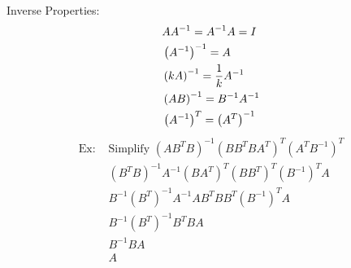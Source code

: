 \documentclass[11pt, fleqn]{article}
\begin{document}
Inverse Properties:
\begin{align*}
    &AA^{-1}=A^{-1}A=I\\
    &\left( A^{-1} \right)^{-1}=A\\
    &\left( kA \right)^{-1}=\frac{1}{k}A^{-1}\\
    &\left( AB \right)^{-1}=B^{-1}A^{-1}\\
    &\left( A^{-1} \right)^T=\left( A^T \right)^{-1}
\end{align*}
\begin{align*}
    \text{Ex: }&\text{Simplify }(AB^TB)^{-1}(BB^TBA^T)^T(A^TB^{-1})^T\\
    &(B^TB)^{-1}A^{-1}(BA^T)^T(BB^T)^T(B^{-1})^TA\\
    &B^{-1}(B^T)^{-1}A^{-1}AB^TBB^T(B^{-1})^TA\\
    &B^{-1}(B^T)^{-1}B^TBA\\
    &B^{-1}BA\\
    &A
\end{align*}
\end{document}
